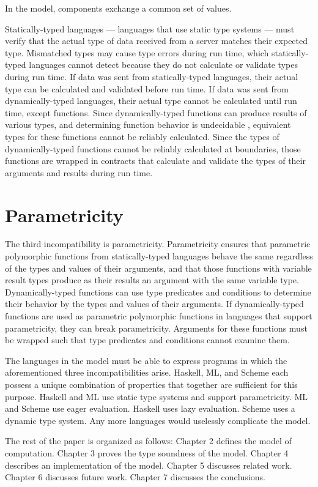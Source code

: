 In the model, components exchange a common set of values.

Statically-typed languages --- languages that use static type systems --- must verify that the actual type of data received from a server matches their expected type.  Mismatched types may cause type errors during run time, which statically-typed languages cannot detect because they do not calculate or validate types during run time.  If data was sent from statically-typed languages, their actual type can be calculated and validated before run time.  If data was sent from dynamically-typed languages, their actual type cannot be calculated until run time, except functions.  Since dynamically-typed functions can produce results of various types, and determining function behavior is undecidable \cite{blume04}, equivalent types for these functions cannot be reliably calculated.  Since the types of dynamically-typed functions cannot be reliably calculated at boundaries, those functions are wrapped in contracts \cite{findler02} that calculate and validate the types of their arguments and results during run time.

\section{Parametricity}

The third incompatibility is parametricity.  Parametricity ensures that parametric polymorphic functions from statically-typed languages behave the same regardless of the types and values of their arguments, and that those functions with variable result types produce as their results an argument with the same variable type.  Dynamically-typed functions can use type predicates and conditions to determine their behavior by the types and values of their arguments.  If dynamically-typed functions are used as parametric polymorphic functions in languages that support parametricity, they can break parametricity.  Arguments for these functions must be wrapped such that type predicates and conditions cannot examine them.

The languages in the model must be able to express programs in which the aforementioned three incompatibilities arise.  Haskell, ML, and Scheme each possess a unique combination of properties that together are sufficient for this purpose.  Haskell and ML use static type systems and support parametricity.  ML and Scheme use eager evaluation.  Haskell uses lazy evaluation.  Scheme uses a dynamic type system.  Any more languages would uselessly complicate the model.

The rest of the paper is organized as follows: Chapter 2 defines the model of computation.  Chapter 3 proves the type soundness of the model.  Chapter 4 describes an implementation of the model.  Chapter 5 discusses related work.  Chapter 6 discusses future work.  Chapter 7 discusses the conclusions.